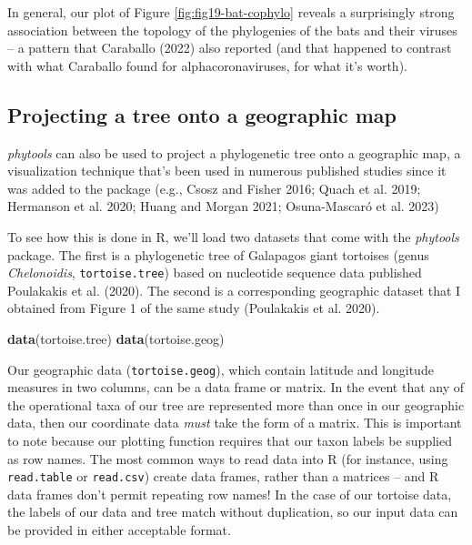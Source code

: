 \documentclass[fleqn,10pt,lineno]{wlpeerj} %
\newenvironment{Shaded}{\begin{snugshade}}{\end{snugshade}}
\newcommand{\FunctionTok}[1]{\textcolor[rgb]{0.13,0.29,0.53}{\textbf{#1}}}
\newcommand{\NormalTok}[1]{#1}
\begin{document}
In general, our plot of Figure \ref{fig:fig19-bat-cophylo} reveals a surprisingly strong association between the topology of the phylogenies of the bats and their viruses -- a pattern that Caraballo (2022) also reported (and that happened to contrast with what Caraballo found for alphacoronaviruses, for what it's worth).

\hypertarget{projecting-a-tree-onto-a-geographic-map}{%
\subsection{Projecting a tree onto a geographic map}\label{projecting-a-tree-onto-a-geographic-map}}

\emph{phytools} can also be used to project a phylogenetic tree onto a geographic map, a visualization technique that's been used in numerous published studies since it was added to the package (e.g., Csosz and Fisher 2016; Quach et al. 2019; Hermanson et al. 2020; Huang and Morgan 2021; Osuna-Mascaró et al. 2023)

To see how this is done in R, we'll load two datasets that come with the \emph{phytools} package. The first is a phylogenetic tree of Galapagos giant tortoises (genus \emph{Chelonoidis}, \texttt{tortoise.tree}) based on nucleotide sequence data published Poulakakis et al. (2020). The second is a corresponding geographic dataset that I obtained from Figure 1 of the same study (Poulakakis et al. 2020).

\begin{Shaded}
\begin{Highlighting}[]
\FunctionTok{data}\NormalTok{(tortoise.tree)}
\FunctionTok{data}\NormalTok{(tortoise.geog)}
\end{Highlighting}
\end{Shaded}

Our geographic data (\texttt{tortoise.geog}), which contain latitude and longitude measures in two columns, can be a data frame or matrix. In the event that any of the operational taxa of our tree are represented more than once in our geographic data, then our coordinate data \emph{must} take the form of a matrix. This is important to note because our plotting function requires that our taxon labels be supplied as row names. The most common ways to read data into R (for instance, using \texttt{read.table} or \texttt{read.csv}) create data frames, rather than a matrices -- and R data frames don't permit repeating row names! In the case of our tortoise data, the labels of our data and tree match without duplication, so our input data can be provided in either acceptable format.
\end{document}
